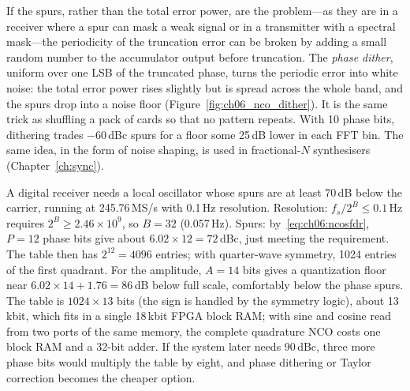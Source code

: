 If the spurs, rather than the total error power, are the problem---as they are in a receiver where a
spur can mask a weak signal or in a transmitter with a spectral mask---the periodicity of the
truncation error can be broken by adding a small random number to the accumulator output before
truncation. The \emph{phase dither}, uniform over one LSB of the truncated phase, turns the
periodic error into white noise: the total error power rises slightly but is spread across the whole
band, and the spurs drop into a noise floor (Figure~\ref{fig:ch06_nco_dither}). It is the same trick
as shuffling a pack of cards so that no pattern repeats. With 10 phase bits, dithering trades
$-60$\,dBc spurs for a floor some 25\,dB lower in each FFT bin. The same idea, in the form of noise
shaping, is used in fractional-$N$ synthesisers (Chapter~\ref{ch:sync}).


\begin{worked}
A digital receiver needs a local oscillator whose spurs are at least 70\,dB below the carrier,
running at 245.76\,MS/s with 0.1\,Hz resolution. Resolution: $f_s/2^B\le0.1$\,Hz requires
$2^B\ge2.46\times10^9$, so $B=32$ (0.057\,Hz). Spurs: by~\eqref{eq:ch06:ncosfdr}, $P=12$ phase bits
give about $6.02\times12=72$\,dBc, just meeting the requirement. The table then has $2^{12}=4096$
entries; with quarter-wave symmetry, 1024 entries of the first quadrant. For the amplitude, $A=14$
bits gives a quantization floor near $6.02\times14+1.76=86$\,dB below full scale, comfortably below
the phase spurs. The table is $1024\times13$ bits (the sign is handled by the symmetry logic), about
13\,kbit, which fits in a single 18\,kbit FPGA block RAM; with sine and cosine read from two ports
of the same memory, the complete quadrature NCO costs one block RAM and a 32-bit adder. If the system
later needs 90\,dBc, three more phase bits would multiply the table by eight, and phase dithering
or Taylor correction becomes the cheaper option.
\end{worked}


